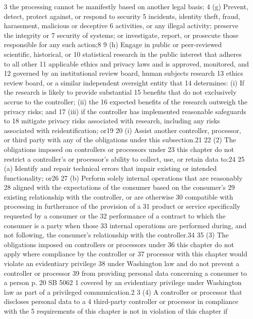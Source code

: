 3 the processing cannot be manifestly based on another legal basis;
4 (g) Prevent, detect, protect against, or respond to security
5 incidents, identity theft, fraud, harassment, malicious or deceptive
6 activities, or any illegal activity; preserve the integrity or
7 security of systems; or investigate, report, or prosecute those
responsible for any such action;8
9 (h) Engage in public or peer-reviewed scientific, historical, or
10 statistical research in the public interest that adheres to all other
11 applicable ethics and privacy laws and is approved, monitored, and
12 governed by an institutional review board, human subjects research
13 ethics review board, or a similar independent oversight entity that
14 determines: (i) If the research is likely to provide substantial
15 benefits that do not exclusively accrue to the controller; (ii) the
16 expected benefits of the research outweigh the privacy risks; and
17 (iii) if the controller has implemented reasonable safeguards to
18 mitigate privacy risks associated with research, including any risks
associated with reidentification; or19
20 (i) Assist another controller, processor, or third party with any
of the obligations under this subsection.21
22 (2) The obligations imposed on controllers or processors under
23 this chapter do not restrict a controller's or processor's ability to
collect, use, or retain data to:24
25 (a) Identify and repair technical errors that impair existing or
intended functionality; or26
27 (b) Perform solely internal operations that are reasonably
28 aligned with the expectations of the consumer based on the consumer's
29 existing relationship with the controller, or are otherwise
30 compatible with processing in furtherance of the provision of a
31 product or service specifically requested by a consumer or the
32 performance of a contract to which the consumer is a party when those
33 internal operations are performed during, and not following, the
consumer's relationship with the controller.34
35 (3) The obligations imposed on controllers or processors under
36 this chapter do not apply where compliance by the controller or
37 processor with this chapter would violate an evidentiary privilege
38 under Washington law and do not prevent a controller or processor
39 from providing personal data concerning a consumer to a person
p. 20 SB 5062
1 covered by an evidentiary privilege under Washington law as part of a
privileged communication.2
3 (4) A controller or processor that discloses personal data to a
4 third-party controller or processor in compliance with the
5 requirements of this chapter is not in violation of this chapter if

